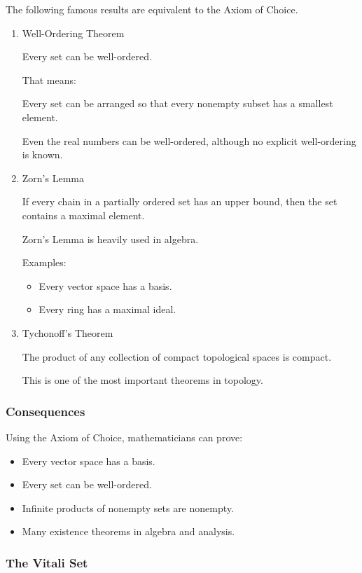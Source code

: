 \documentclass[11pt]{article}
\begin{document}
The following famous results are equivalent to the Axiom of Choice.
\begin{enumerate}
\item Well-Ordering Theorem
\label{sec:org3aa999d}

Every set can be well-ordered.

That means:

Every set can be arranged so that every nonempty subset has a smallest element.

Even the real numbers can be well-ordered, although no explicit well-ordering is known.
\item Zorn's Lemma
\label{sec:orga2bfb95}

If every chain in a partially ordered set has an upper bound, then the set contains a maximal element.

Zorn's Lemma is heavily used in algebra.

Examples:

\begin{itemize}
\item Every vector space has a basis.
\item Every ring has a maximal ideal.
\end{itemize}
\item Tychonoff's Theorem
\label{sec:orgc44967e}

The product of any collection of compact topological spaces is compact.

This is one of the most important theorems in topology.
\end{enumerate}
\subsubsection{Consequences}
\label{sec:org80d643b}

Using the Axiom of Choice, mathematicians can prove:

\begin{itemize}
\item Every vector space has a basis.
\item Every set can be well-ordered.
\item Infinite products of nonempty sets are nonempty.
\item Many existence theorems in algebra and analysis.
\end{itemize}
\subsubsection{The Vitali Set}
\label{sec:org136ab4f}
\end{document}
